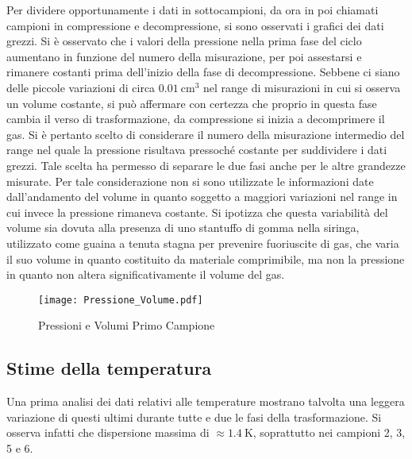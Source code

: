 \documentclass[a4paper,11pt,oneside]{article}
\begin{document}
Per dividere opportunamente i dati in sottocampioni, da ora in poi chiamati campioni in compressione e decompressione, si sono osservati i grafici dei dati grezzi. Si è osservato che i valori della pressione nella prima fase del ciclo aumentano in funzione del numero della misurazione, per poi assestarsi e rimanere costanti prima dell'inizio della fase di decompressione. Sebbene ci siano delle piccole variazioni di circa $\SI{0.01}{\centi\meter\cubed}$ nel range di misurazioni in cui si osserva un volume costante, si può affermare con certezza che proprio in questa fase cambia il verso di trasformazione, da compressione si inizia a decomprimere il gas. Si è pertanto scelto di considerare il numero della misurazione intermedio del range nel quale la pressione risultava pressoché costante per suddividere i dati grezzi. Tale scelta ha permesso di separare le due fasi anche per le altre grandezze misurate. Per tale considerazione non si sono utilizzate le informazioni date dall'andamento del volume in quanto soggetto a maggiori variazioni nel range in cui invece la pressione rimaneva costante. Si ipotizza che questa variabilità del volume sia dovuta alla presenza di uno stantuffo di gomma nella siringa, utilizzato come guaina a tenuta stagna per prevenire fuoriuscite di gas, che varia il suo volume in quanto costituito da materiale comprimibile, ma non la pressione in quanto non altera significativamente il volume del gas.

\begin{figure}[h!]
    \centering
    \texttt{[image: Pressione\_Volume.pdf]}
    \caption{Pressioni e Volumi Primo Campione}
    \label{fig:campione2}
\end{figure}



\subsection{Stime della temperatura}
Una prima analisi dei dati relativi alle temperature mostrano talvolta una leggera variazione di questi ultimi durante tutte e due le fasi della trasformazione. Si osserva infatti che dispersione massima di $\approx \SI{1.4}{\kelvin}$, soprattutto nei campioni 2, 3, 5 e 6. 
\end{document}
